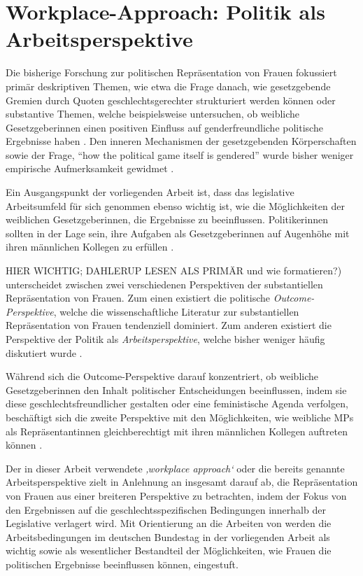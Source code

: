 \documentclass[12pt, 
    twoside=false, 
    bibliography=totoc, 
    numbers=endperiod, 
    headings=normal, 
    toc=chapterentrydotfill
    ]{scrbook}
\begin{document}
\section{Workplace-Approach: Politik als Arbeitsperspektive} 

Die bisherige Forschung zur politischen Repräsentation von Frauen fokussiert primär deskriptiven Themen, wie etwa die Frage danach, wie gesetzgebende Gremien durch Quoten geschlechtsgerechter strukturiert werden können \parencites [vgl.]{dahlerup_2005}{schwindt-bayer_2009} oder substantive Themen, welche beispielsweise untersuchen, ob weibliche Gesetzgeberinnen einen positiven Einfluss auf genderfreundliche politische Ergebnisse haben \parencites [199]{erikson_2018}{beckwith_2007}. Den inneren Mechanismen der gesetzgebenden Körperschaften sowie der Frage, \enquote{how the political game itself is gendered} wurde bisher weniger empirische Aufmerksamkeit gewidmet \parencites[199]{erikson_2018}[vgl.][]{childs_2016}{dahlerup_2013}{wangnerud_2015}.

Ein Ausgangspunkt der vorliegenden Arbeit ist, dass das legislative Arbeitsumfeld für sich genommen ebenso wichtig ist, wie die Möglichkeiten der weiblichen Gesetzgeberinnen, die Ergebnisse zu beeinflussen. Politikerinnen sollten in der Lage sein, ihre Aufgaben als Gesetzgeberinnen auf Augenhöhe mit ihren männlichen Kollegen zu erfüllen \parencite[199]{erikson_2018}. 

\textcites{dahlerup_2006}{dahlerup_1988} HIER WICHTIG; DAHLERUP LESEN ALS PRIMÄR und wie formatieren?) unterscheidet zwischen zwei verschiedenen Perspektiven der substantiellen Repräsentation von Frauen. Zum einen existiert die politische \emph{Outcome-Perspektive}, welche die wissenschaftliche Literatur zur substantiellen Repräsentation von Frauen tendenziell dominiert. Zum anderen existiert die Perspektive der Politik als \emph{Arbeitsperspektive}, welche bisher weniger häufig diskutiert wurde \parencites[513]{dahlerup_2006}[199]{erikson_2018}. 

Während sich die Outcome-Perspektive darauf konzentriert, ob weibliche Gesetzgeberinnen den Inhalt politischer Entscheidungen beeinflussen, indem sie diese geschlechtsfreundlicher gestalten oder eine feministische Agenda verfolgen, beschäftigt sich die zweite Perspektive mit den Möglichkeiten, wie weibliche MPs als Repräsentantinnen gleichberechtigt mit ihren männlichen Kollegen auftreten können \parencites[199]{erikson_2018}{dahlerup_2006}{dahlerup_1988}.

Der in dieser Arbeit verwendete \emph{‚workplace approach‘} oder die bereits genannte Arbeitsperspektive zielt in Anlehnung an \textcite{erikson_2018} insgesamt darauf ab, die Repräsentation von Frauen aus einer breiteren Perspektive zu betrachten, indem der Fokus von den Ergebnissen auf die geschlechtsspezifischen Bedingungen innerhalb der Legislative verlagert wird. Mit Orientierung an die Arbeiten von \textcites{dahlerup_2006}{dahlerup_1988}{erikson_2018} werden die  Arbeitsbedingungen im deutschen Bundestag in der vorliegenden Arbeit als wichtig sowie als wesentlicher Bestandteil der Möglichkeiten, wie Frauen die politischen Ergebnisse beeinflussen können, eingestuft.
\end{document}
